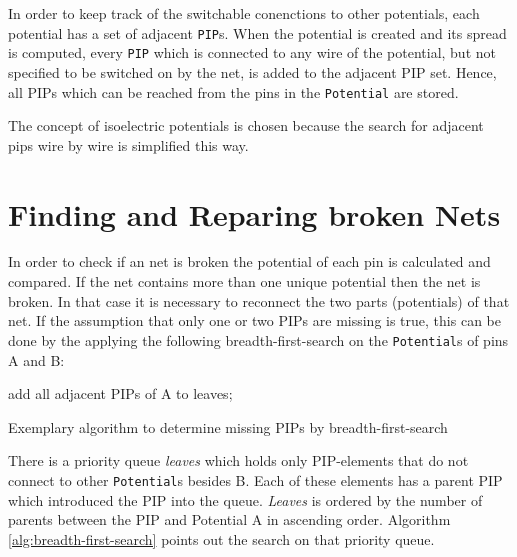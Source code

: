 In order to keep track of the switchable conenctions to other potentials, each potential has a set of adjacent \texttt{PIP}s. When the potential is created and its spread is computed, every \texttt{PIP} which is connected to any wire of the potential, but not specified to be switched on by the net, is added to the adjacent PIP set. Hence, all PIPs which can be reached from the pins in the \texttt{Potential} are stored.

The concept of isoelectric potentials is chosen because the search for adjacent pips wire by wire is simplified this way.


\newpage
\section{Finding and Reparing broken Nets}
\label{sec:findingandrepairingbrokennets}

In order to check if an net is broken the potential of each pin is calculated and compared. If the net contains more than one unique potential then the net is broken.
In that case it is necessary to reconnect the two parts (potentials) of that net. If the assumption that only one or two PIPs are missing is true, this can be done by the applying the following breadth-first-search on the \texttt{Potential}s of pins A and B:

\begin{algorithm}[H]
	add all adjacent PIPs of A to leaves;\\
 \caption{Exemplary algorithm to determine missing PIPs by breadth-first-search}
 \label{alg:breadth-first-search}
\end{algorithm}


There is a priority queue \textit{leaves} which holds only PIP-elements that do not connect to other \texttt{Potential}s besides B. 
Each of these elements has a parent PIP which introduced the PIP into the queue. \textit{Leaves} is ordered by the number of parents between the PIP and Potential A in ascending order. Algorithm \ref{alg:breadth-first-search} points out the search on that priority queue.



